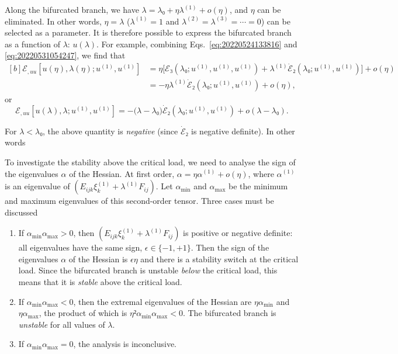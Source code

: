 \documentclass[12pt, final]{scrartcl}
\theoremstyle{definition}
\newcommand{\E}{\mathcal E}
\newcommand{\order}[2][1]{#2^{(#1)}}
\begin{document}
Along the bifurcated branch, we have $λ = λ₀ + η \order[1]λ + o(η)$, and $η$ can be
eliminated. In other words, $η=λ$ ($\order[1]λ=1$ and $\order[2]λ = \order[3]λ = \cdots = 0$) can
be selected as a parameter. It is therefore possible to express the bifurcated
branch as a function of $λ$: $u(λ)$. For example, combining
Eqs.~\eqref{eq:20220524133816} and \eqref{eq:20220531054247}, we find that
\begin{equation}
  \begin{aligned}[b]
    \E_{, uu}[u(η), λ(η); \order[1]u, \order[1]u]
    &= η \bigl[\E₃(λ₀ ; \order[1]u, \order[1]u, \order[1]u)  + \order[1]λ \dot{\E}₂(λ₀; \order[1]u, \order[1]u)\bigr] + o(η)\\
    &= - η \order[1]λ \dot{\E}₂(λ₀; \order[1]u, \order[1]u) + o(η),
  \end{aligned}
\end{equation}
or
\begin{equation}
  \label{eq:20220819160235}
  \E_{, uu}[u(λ), λ; \order[1]u, \order[1]u] = -\bigl( λ - λ₀ \bigr) \dot{\E}₂(λ₀; \order[1]u, \order[1]u) + o(λ - λ₀).
\end{equation}

For $λ < λ₀$, the above quantity is \emph{negative} (since $\dot{\E}₂$ is
negative definite). In other words

\begin{center}
\end{center}

To investigate the stability above the critical load, we need to analyse the
sign of the eigenvalues $α$ of the Hessian. At first order,
$α = η \order[1]α + o(η)$, where $\order[1]α$ is an eigenvalue of
$(E_{ijk} \order[1]{ξ_k} + \order[1]λ F_{ij})$. Let $α_{\min}$ and $α_{\max}$ be the minimum
and maximum eigenvalues of this second-order tensor. Three cases must be
discussed
\begin{enumerate}
\item If $α_{\min} α_{\max} > 0$, then $(E_{ijk} \order[1]{ξ_k} + \order[1]λ F_{ij})$ is
  positive or negative definite: all eigenvalues have the same sign,
  $\epsilon ∈ \{-1, +1\}$. Then the sign of the eigenvalues $α$ of the
  Hessian is $\epsilon η$ and there is a stability switch at the critical
  load. Since the bifurcated branch is unstable \emph{below} the critical load,
  this means that it is \emph{stable} above the critical load.
\item If $α_{\min} α_{\max} < 0$, then the extremal eigenvalues of the Hessian
  are $η α_{\min}$ and $η α_{\max}$, the product of which is
  $η² α_{\min} α_{\max} < 0$. The bifurcated branch is \emph{unstable} for all
  values of $λ$.
\item If $α_{\min} α_{\max} = 0$, the analysis is inconclusive.
\end{enumerate}
\end{document}
